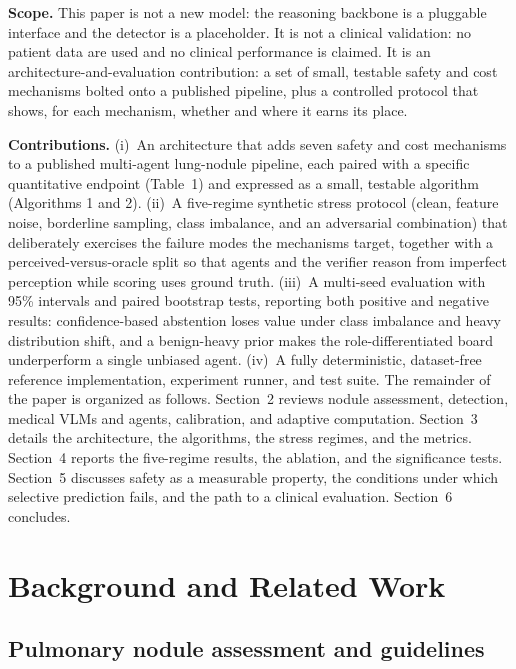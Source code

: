 \documentclass[12pt]{article}
\begin{document}
\textbf{Scope.} This paper is not a new model: the reasoning backbone is a pluggable interface and the detector is a placeholder. It is not a clinical validation: no patient data are used and no clinical performance is claimed. It is an architecture-and-evaluation contribution: a set of small, testable safety and cost mechanisms bolted onto a published pipeline, plus a controlled protocol that shows, for each mechanism, whether and where it earns its place.


\textbf{Contributions.} (i)~An architecture that adds seven safety and cost mechanisms to a published multi-agent lung-nodule pipeline, each paired with a specific quantitative endpoint (Table~1) and expressed as a small, testable algorithm (Algorithms 1 and 2). (ii)~A five-regime synthetic stress protocol (clean, feature noise, borderline sampling, class imbalance, and an adversarial combination) that deliberately exercises the failure modes the mechanisms target, together with a perceived-versus-oracle split so that agents and the verifier reason from imperfect perception while scoring uses ground truth. (iii)~A multi-seed evaluation with 95\% intervals and paired bootstrap tests, reporting both positive and negative results: confidence-based abstention loses value under class imbalance and heavy distribution shift, and a benign-heavy prior makes the role-differentiated board underperform a single unbiased agent. (iv)~A fully deterministic, dataset-free reference implementation, experiment runner, and test suite. The remainder of the paper is organized as follows. Section~2 reviews nodule assessment, detection, medical VLMs and agents, calibration, and adaptive computation. Section~3 details the architecture, the algorithms, the stress regimes, and the metrics. Section~4 reports the five-regime results, the ablation, and the significance tests. Section~5 discusses safety as a measurable property, the conditions under which selective prediction fails, and the path to a clinical evaluation. Section~6 concludes.

\section{Background and Related Work}\label{sec:bg}
\subsection{Pulmonary nodule assessment and guidelines}
\end{document}
